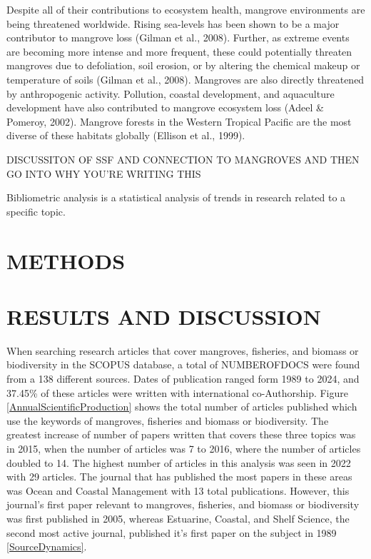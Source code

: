 \documentclass[
  12pt,
]{article}
\begin{document}
Despite all of their contributions to ecosystem health, mangrove environments are being threatened worldwide. Rising sea-levels has been shown to be a major contributor to mangrove loss (Gilman et al., 2008). Further, as extreme events are becoming more intense and more frequent, these could potentially threaten mangroves due to defoliation, soil erosion, or by altering the chemical makeup or temperature of soils (Gilman et al., 2008). Mangroves are also directly threatened by anthropogenic activity. Pollution, coastal development, and aquaculture development have also contributed to mangrove ecosystem loss (Adeel \& Pomeroy, 2002). Mangrove forests in the Western Tropical Pacific are the most diverse of these habitats globally (Ellison et al., 1999).

DISCUSSITON OF SSF AND CONNECTION TO MANGROVES AND THEN GO INTO WHY YOU'RE WRITING THIS

Bibliometric analysis is a statistical analysis of trends in research related to a specific topic.

\hypertarget{methods}{%
\section{METHODS}\label{methods}}

\hypertarget{results-and-discussion}{%
\section{RESULTS AND DISCUSSION}\label{results-and-discussion}}

When searching research articles that cover mangroves, fisheries, and biomass or biodiversity in the SCOPUS database, a total of NUMBEROFDOCS were found from a 138 different sources. Dates of publication ranged form 1989 to 2024, and 37.45\% of these articles were written with international co-Authorship. Figure \ref{AnnualScientificProduction} shows the total number of articles published which use the keywords of mangroves, fisheries and biomass or biodiversity. The greatest increase of number of papers written that covers these three topics was in 2015, when the number of articles was 7 to 2016, where the number of articles doubled to 14. The highest number of articles in this analysis was seen in 2022 with 29 articles. The journal that has published the most papers in these areas was Ocean and Coastal Management with 13 total publications. However, this journal's first paper relevant to mangroves, fisheries, and biomass or biodiversity was first published in 2005, whereas Estuarine, Coastal, and Shelf Science, the second most active journal, published it's first paper on the subject in 1989 \ref{SourceDynamics}.
\end{document}
